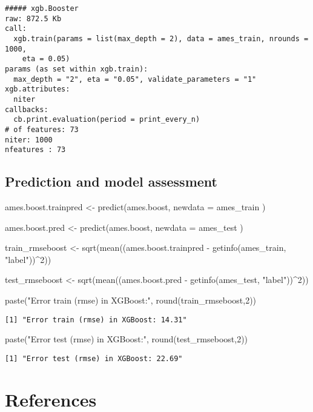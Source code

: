 \documentclass[
  letterpaper,
  DIV=11,
  numbers=noendperiod,
  oneside]{scrartcl}
\newenvironment{Shaded}{\begin{snugshade}}{\end{snugshade}}
\newcommand{\AttributeTok}[1]{\textcolor[rgb]{0.40,0.45,0.13}{#1}}
\newcommand{\DecValTok}[1]{\textcolor[rgb]{0.68,0.00,0.00}{#1}}
\newcommand{\FunctionTok}[1]{\textcolor[rgb]{0.28,0.35,0.67}{#1}}
\newcommand{\NormalTok}[1]{\textcolor[rgb]{0.00,0.23,0.31}{#1}}
\newcommand{\OtherTok}[1]{\textcolor[rgb]{0.00,0.23,0.31}{#1}}
\newcommand{\SpecialCharTok}[1]{\textcolor[rgb]{0.37,0.37,0.37}{#1}}
\newcommand{\StringTok}[1]{\textcolor[rgb]{0.13,0.47,0.30}{#1}}
\begin{document}
\begin{verbatim}
##### xgb.Booster
raw: 872.5 Kb 
call:
  xgb.train(params = list(max_depth = 2), data = ames_train, nrounds = 1000, 
    eta = 0.05)
params (as set within xgb.train):
  max_depth = "2", eta = "0.05", validate_parameters = "1"
xgb.attributes:
  niter
callbacks:
  cb.print.evaluation(period = print_every_n)
# of features: 73 
niter: 1000
nfeatures : 73 
\end{verbatim}

\subsection{Prediction and model
assessment}\label{prediction-and-model-assessment}

\begin{Shaded}
\begin{Highlighting}[]
\NormalTok{ames.boost.trainpred }\OtherTok{\textless{}{-}} \FunctionTok{predict}\NormalTok{(ames.boost,}
                   \AttributeTok{newdata =}\NormalTok{ ames\_train}
\NormalTok{                 )}

\NormalTok{ames.boost.pred }\OtherTok{\textless{}{-}} \FunctionTok{predict}\NormalTok{(ames.boost,}
                   \AttributeTok{newdata =}\NormalTok{ ames\_test}
\NormalTok{                 )}

\NormalTok{train\_rmseboost }\OtherTok{\textless{}{-}} \FunctionTok{sqrt}\NormalTok{(}\FunctionTok{mean}\NormalTok{((ames.boost.trainpred }\SpecialCharTok{{-}} \FunctionTok{getinfo}\NormalTok{(ames\_train, }\StringTok{"label"}\NormalTok{))}\SpecialCharTok{\^{}}\DecValTok{2}\NormalTok{))}

\NormalTok{test\_rmseboost }\OtherTok{\textless{}{-}} \FunctionTok{sqrt}\NormalTok{(}\FunctionTok{mean}\NormalTok{((ames.boost.pred }\SpecialCharTok{{-}} \FunctionTok{getinfo}\NormalTok{(ames\_test, }\StringTok{"label"}\NormalTok{))}\SpecialCharTok{\^{}}\DecValTok{2}\NormalTok{))}

\FunctionTok{paste}\NormalTok{(}\StringTok{"Error train (rmse) in XGBoost:"}\NormalTok{, }\FunctionTok{round}\NormalTok{(train\_rmseboost,}\DecValTok{2}\NormalTok{))}
\end{Highlighting}
\end{Shaded}

\begin{verbatim}
[1] "Error train (rmse) in XGBoost: 14.31"
\end{verbatim}

\begin{Shaded}
\begin{Highlighting}[]
\FunctionTok{paste}\NormalTok{(}\StringTok{"Error test (rmse) in XGBoost:"}\NormalTok{, }\FunctionTok{round}\NormalTok{(test\_rmseboost,}\DecValTok{2}\NormalTok{))}
\end{Highlighting}
\end{Shaded}

\begin{verbatim}
[1] "Error test (rmse) in XGBoost: 22.69"
\end{verbatim}

\section{References}\label{references}
\end{document}

